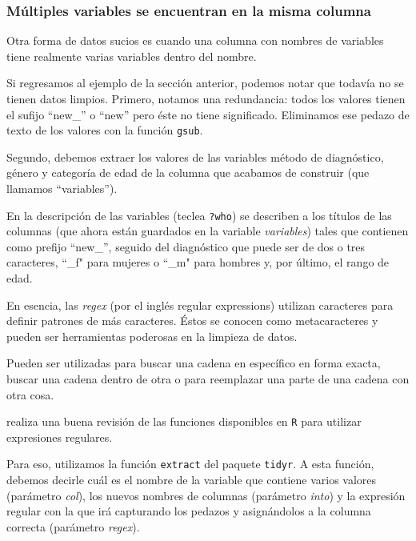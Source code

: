 \documentclass[]{article}
\begin{document}
\subsubsection{Múltiples variables se encuentran en la misma
columna}\label{multiples-variables-se-encuentran-en-la-misma-columna}

Otra forma de datos sucios es cuando una columna con nombres de
variables tiene realmente varias variables dentro del nombre.

Si regresamos al ejemplo de la sección anterior, podemos notar que
todavía no se tienen datos limpios. Primero, notamos una redundancia:
todos los valores tienen el sufijo ``new\_'' o ``new'' pero éste no
tiene significado. Eliminamos ese pedazo de texto de los valores con la
función \texttt{gsub}.

Segundo, debemos extraer los valores de las variables método de
diagnóstico, género y categoría de edad de la columna que acabamos de
construir (que llamamos ``variables'').

En la descripción de las variables (teclea \texttt{?who}) se describen a
los títulos de las columnas (que ahora están guardados en la variable
\emph{variables}) tales que contienen como prefijo ``new\_'', seguido
del diagnóstico que puede ser de dos o tres caracteres, ``\_f" para
mujeres o ``\_m" para hombres y, por último, el rango de edad.

\begin{curiosidad}
En esencia, las \textit{regex} (por el inglés regular expressions) utilizan 
caracteres para definir patrones de más caracteres. Éstos se conocen como 
metacaracteres y pueden ser herramientas poderosas en la limpieza de datos.

Pueden ser utilizadas para buscar una cadena en específico en forma exacta, 
buscar una cadena dentro de otra o para reemplazar una parte de una cadena con
otra cosa.

\textcite[][sección ``text processing and regular expressions'']{peng2016m} 
realiza una buena revisión de las funciones disponibles en \texttt{R} para 
utilizar expresiones regulares. 
\end{curiosidad}

Para eso, utilizamos la función \texttt{extract} del paquete
\texttt{tidyr}. A esta función, debemos decirle cuál es el nombre de la
variable que contiene varios valores (parámetro \emph{col}), los nuevos
nombres de columnas (parámetro \emph{into}) y la expresión regular con
la que irá capturando los pedazos y asignándolos a la columna correcta
(parámetro \emph{regex}).
\end{document}
